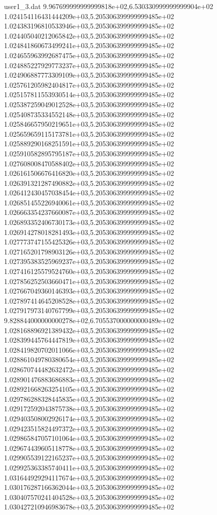 \begin{filecontents}{user1_3.dat}
9.967699999999999818e+02,6.530330999999999904e+02
1.024154116431444209e+03,5.205306399999999485e+02
1.024383196810533946e+03,5.205306399999999485e+02
1.024405040212065842e+03,5.205306399999999485e+02
1.024841860673499241e+03,5.205306399999999485e+02
1.024655963992687475e+03,5.205306399999999485e+02
1.024885227929773237e+03,5.205306399999999485e+02
1.024906887773309109e+03,5.205306399999999485e+02
1.025761205982404817e+03,5.205306399999999485e+02
1.025157811553930514e+03,5.205306399999999485e+02
1.025387259049012528e+03,5.205306399999999485e+02
1.025408735334552148e+03,5.205306399999999485e+02
1.025846657950219651e+03,5.205306399999999485e+02
1.025659659115173781e+03,5.205306399999999485e+02
1.025889290168251591e+03,5.205306399999999485e+02
1.025910582895795187e+03,5.205306399999999485e+02
1.027608008470588402e+03,5.205306399999999485e+02
1.026161506676416820e+03,5.205306399999999485e+02
1.026391321287490882e+03,5.205306399999999485e+02
1.026412430457038454e+03,5.205306399999999485e+02
1.026851455226940061e+03,5.205306399999999485e+02
1.026663354237660087e+03,5.205306399999999485e+02
1.026893352406730173e+03,5.205306399999999485e+02
1.026914278018281493e+03,5.205306399999999485e+02
1.027773747155425326e+03,5.205306399999999485e+02
1.027165201798903126e+03,5.205306399999999485e+02
1.027395383525969237e+03,5.205306399999999485e+02
1.027416125579524760e+03,5.205306399999999485e+02
1.027856252503660471e+03,5.205306399999999485e+02
1.027667049360146393e+03,5.205306399999999485e+02
1.027897414645208528e+03,5.205306399999999485e+02
1.027917973140767799e+03,5.205306399999999485e+02
9.828844000000000278e+02,6.705537000000000489e+02
1.028168896921389432e+03,5.205306399999999485e+02
1.028399445764447819e+03,5.205306399999999485e+02
1.028419820702011066e+03,5.205306399999999485e+02
1.028861049780380654e+03,5.205306399999999485e+02
1.028670744482632472e+03,5.205306399999999485e+02
1.028901476883686883e+03,5.205306399999999485e+02
1.028921668263254105e+03,5.205306399999999485e+02
1.029786288328445835e+03,5.205306399999999485e+02
1.029172592043875738e+03,5.205306399999999485e+02
1.029403508002926174e+03,5.205306399999999485e+02
1.029423515824497372e+03,5.205306399999999485e+02
1.029865847057101064e+03,5.205306399999999485e+02
1.029674439605118778e+03,5.205306399999999485e+02
1.029905539122165237e+03,5.205306399999999485e+02
1.029925363385740411e+03,5.205306399999999485e+02
1.031644929294117674e+03,5.205306399999999485e+02
1.030176287166362044e+03,5.205306399999999485e+02
1.030407570241404528e+03,5.205306399999999485e+02
1.030427210946983678e+03,5.205306399999999485e+02

\end{filecontents}
